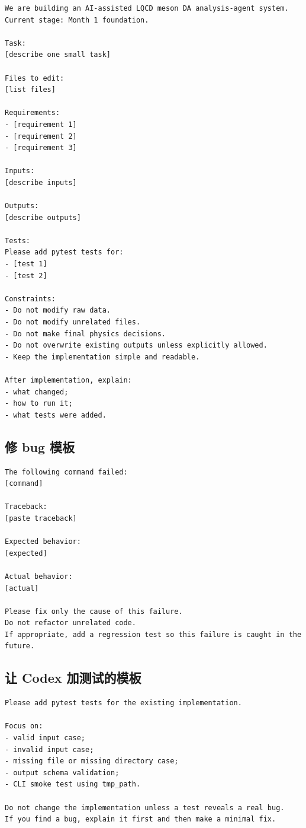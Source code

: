\documentclass[11pt,a4paper,fontset=fandol]{ctexart}
\begin{document}
\begin{lstlisting}
We are building an AI-assisted LQCD meson DA analysis-agent system.
Current stage: Month 1 foundation.

Task:
[describe one small task]

Files to edit:
[list files]

Requirements:
- [requirement 1]
- [requirement 2]
- [requirement 3]

Inputs:
[describe inputs]

Outputs:
[describe outputs]

Tests:
Please add pytest tests for:
- [test 1]
- [test 2]

Constraints:
- Do not modify raw data.
- Do not modify unrelated files.
- Do not make final physics decisions.
- Do not overwrite existing outputs unless explicitly allowed.
- Keep the implementation simple and readable.

After implementation, explain:
- what changed;
- how to run it;
- what tests were added.
\end{lstlisting}

\subsection{修 bug 模板}

\begin{lstlisting}
The following command failed:
[command]

Traceback:
[paste traceback]

Expected behavior:
[expected]

Actual behavior:
[actual]

Please fix only the cause of this failure.
Do not refactor unrelated code.
If appropriate, add a regression test so this failure is caught in the future.
\end{lstlisting}

\subsection{让 Codex 加测试的模板}

\begin{lstlisting}
Please add pytest tests for the existing implementation.

Focus on:
- valid input case;
- invalid input case;
- missing file or missing directory case;
- output schema validation;
- CLI smoke test using tmp_path.

Do not change the implementation unless a test reveals a real bug.
If you find a bug, explain it first and then make a minimal fix.
\end{lstlisting}
\end{document}
